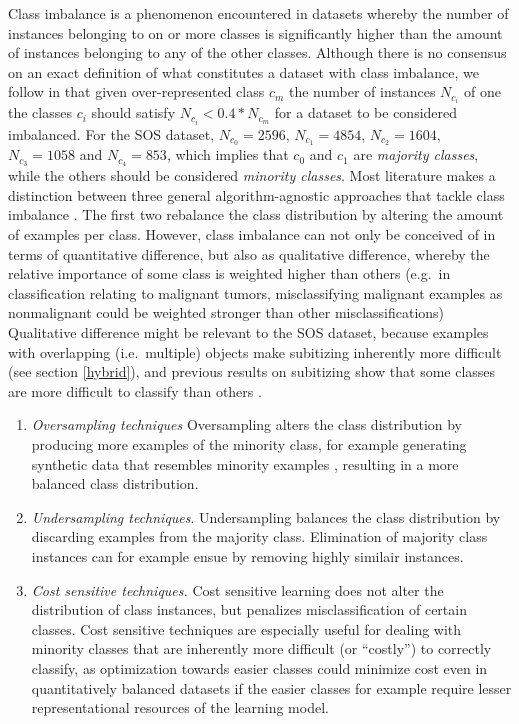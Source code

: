 \documentclass[twocolumn]{article}
\providecommand{\tightlist}{%
  \setlength{\itemsep}{0pt}\setlength{\parskip}{0pt}}
\begin{document}
Class imbalance is a phenomenon encountered in datasets whereby the
number of instances belonging to on or more classes is significantly
higher than the amount of instances belonging to any of the other
classes. Although there is no consensus on an exact definition of what
constitutes a dataset with class imbalance, we follow
\citet{fernandez2013} in that given over-represented class \(c_m\) the
number of instances \(N_{c_i}\) of one the classes \(c_i\) should
satisfy \(N_{c_i} < 0.4 * N_{c_m}\) for a dataset to be considered
imbalanced. For the SOS dataset, \(N_{c_0} = 2596\), \(N_{c_1} = 4854\),
\(N_{c_2} = 1604\), \(N_{c_3} = 1058\) and \(N_{c_4} = 853\), which
implies that \(c_0\) and \(c_1\) are \emph{majority classes}, while the
others should be considered \emph{minority classes}. Most literature
makes a distinction between three general algorithm-agnostic approaches
that tackle class imbalance \citep[for a discussion,
see][]{fernandez2013}. The first two rebalance the class distribution by
altering the amount of examples per class. However, class imbalance can
not only be conceived of in terms of quantitative difference, but also
as qualitative difference, whereby the relative importance of some class
is weighted higher than others (e.g.~in classification relating to
malignant tumors, misclassifying malignant examples as nonmalignant
could be weighted stronger than other misclassifications) Qualitative
difference might be relevant to the SOS dataset, because examples with
overlapping (i.e.~multiple) objects make subitizing inherently more
difficult (see section \ref{hybrid}), and previous results on
subitizing show that some classes are more difficult to classify than
others \citep{zhang2016salient}.

\begin{enumerate}[noitemsep, topsep=0pt]
\def\labelenumi{\arabic{enumi}.}
\tightlist
\item
  \emph{Oversampling techniques} Oversampling alters the class
  distribution by producing more examples of the minority class, for
  example generating synthetic data that resembles minority examples
  \citep[e.g.][]{he2008adasyn, chawla2002smote}, resulting in a more
  balanced class distribution.
\item
  \emph{Undersampling techniques}. Undersampling balances the class
  distribution by discarding examples from the majority class.
  Elimination of majority class instances can for example ensue by
  removing highly similair instances.
  \citep[e.g.][]{tomek1976two}
\item
  \emph{Cost sensitive techniques.} Cost sensitive learning does not
  alter the distribution of class instances, but penalizes
  misclassification of certain classes. Cost sensitive techniques are
  especially useful for dealing with minority classes that are
  inherently more difficult (or ``costly'') to correctly classify, as
  optimization towards easier classes could minimize cost even in
  quantitatively balanced datasets if the easier classes for example
  require lesser representational resources of the learning model.
\end{enumerate}
\end{document}
